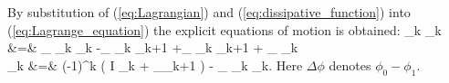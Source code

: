 By substitution of (\ref{eq:Lagrangian}) and (\ref{eq:dissipative_function}) into (\ref{eq:Lagrange_equation}) the explicit equations of motion is obtained:
\bea
\label{eq:equation_of_motion}
\sin \theta_k \dot{\phi}_k &=&
	\omega_ \sin \theta_k \cos \theta_k
	-\Delta\omega_ \sin \theta_k \cos \theta_{k+1}
	+\Delta\omega_ \cos\theta_k \sin\theta_{k+1} \cos\Delta\phi
	+ \alpha_ \dot{\theta}_k \nn \\
\dot{\theta}_k &=&
	(-1)^k
	\left(
		\epsilon\sigma I \sin\theta_k
		+ \Delta\omega_\sin\theta_{k+1}\sin\Delta\phi
	\right)
	- \alpha_ \sin\theta_k \dot{\phi}_k.
\eea
Here $\Delta\phi$ denotes $\phi_0 - \phi_1$.



